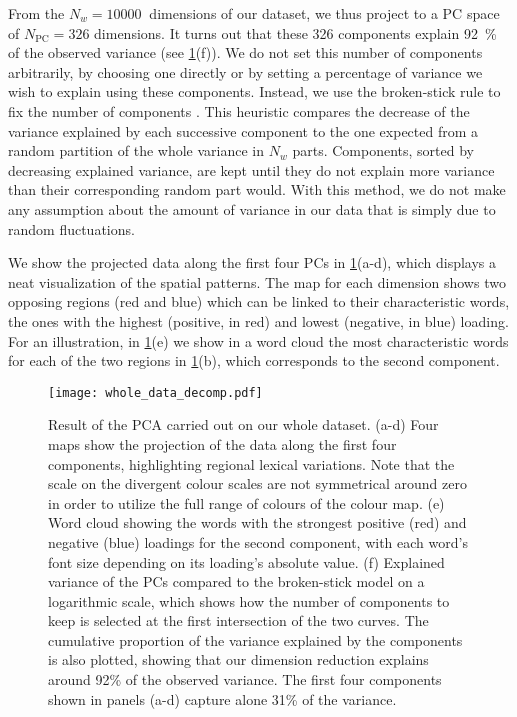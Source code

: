 \documentclass[../thesis.tex]{subfiles}
\begin{document}
From the $N_w = \SI{10000}{}$ dimensions of our dataset, we thus project to a \ac{PC}
space of $N_{\text{PC}} = 326$ dimensions. It turns out that these 326 components
explain 92~\% of the observed variance (see \cref{fig:whole_data_decomp}(f)). We do not
set this number of components arbitrarily, by choosing one directly or by setting a
percentage of variance we wish to explain using these components. Instead, we use the
broken-stick rule to fix the number of components
\cite{FrontierEtudeDecroissance1976,JacksonStoppingRules1993}. This heuristic compares
the decrease of the variance explained by each successive component to the one expected
from a random partition of the whole variance in $N_w$ parts. Components, sorted by
decreasing explained variance, are kept until they do not explain more variance than
their corresponding random part would. With this method, we do not make any assumption
about the amount of variance in our data that is simply due to random fluctuations.

We show the projected data along the first four \acp{PC} in
\cref{fig:whole_data_decomp}(a-d), which displays a neat visualization of the spatial
patterns. The map for each dimension shows two opposing regions (red and blue) which can
be linked to their characteristic words, the ones with the highest (positive, in red)
and lowest (negative, in blue) loading. For an illustration, in
\cref{fig:whole_data_decomp}(e) we show in a word cloud the most characteristic words
for each of the two regions in \cref{fig:whole_data_decomp}(b), which corresponds to the
second component.

\begin{figure}[ht!]
\centering
  \texttt{[image: whole\_data\_decomp.pdf]}
  \caption{Result of the \ac{PCA} carried out on our whole dataset. (a-d) Four maps show
  the projection of the data along the first four components, highlighting regional
  lexical variations. Note that the scale on the divergent colour scales are not
  symmetrical around zero in order to utilize the full range of colours of the colour map.
  (e) Word cloud showing the words with the strongest positive (red) and negative (blue)
  loadings for the second component, with each word's font size depending on its
  loading's absolute value. (f) Explained variance of the \acp{PC} compared to the
  broken-stick model on a logarithmic scale, which shows how the number of components to
  keep is selected at the first intersection of the two curves. The cumulative
  proportion of the variance explained by the components is also plotted, showing that
  our dimension reduction explains around 92\% of the observed variance. The first four
  components shown in panels (a-d) capture alone 31\% of the variance.}
  \label{fig:whole_data_decomp}
\end{figure}
\end{document}
